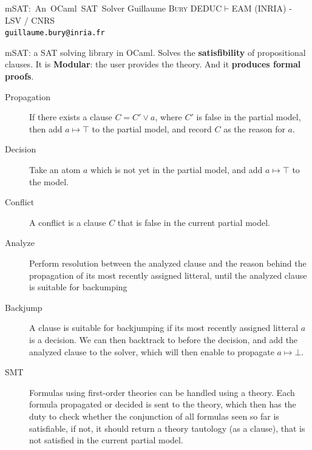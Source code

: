 \documentclass[portrait,a0,final]{a0poster}
\def\msat{\textsf{mSAT}}
\begin{document}
\sffamily %

\postertitle
{\msat{}:~An~OCaml~SAT~Solver}
{Guillaume \textsc{Bury}}
{DEDUC$\vdash$EAM (INRIA) - LSV / CNRS\\
\Large \textcolor{black}{\texttt{guillaume.bury@inria.fr}}}

\begin{center}

\begin{multicols}{2}

{
  \vspace{0.5cm} %

  \msat{}: a SAT solving library in OCaml. Solves the \textbf{satisfibility}
  of propositional clauses. It is \textbf{Modular}: the user provides
  the theory. And it \textbf{produces formal proofs}.
}

{
  \begin{description}
    \item[Propagation] If there exists a clause $C = C' \lor a$, where
      $C'$ is false in the partial model, then add $a \mapsto \top$ to
      the partial model, and record $C$ as the reason for $a$.
    \item[Decision] Take an atom $a$ which is not yet in the partial model,
      and add $a \mapsto \top$ to the model.
    \item[Conflict] A conflict is a clause $C$ that is false in the current partial
      model.
    \item[Analyze] Perform resolution between the analyzed clause and the reason
      behind the propagation of its most recently assigned litteral, until
      the analyzed clause is suitable for backumping
    \item[Backjump] A clause is suitable for backjumping if its most recently
      assigned litteral $a$ is a decision. We can then backtrack to before the
      decision, and add the analyzed clause to the solver, which will then enable
      to propagate $a \mapsto \bot$.
    \item[SMT] Formulas using first-order theories can be handled using a theory.
      Each formula propagated or decided is sent to the theory, which then
      has the duty to check whether the conjunction of all formulas seen so
      far is satisfiable, if not, it should return a theory tautology (as a clause),
      that is not satisfied in the current partial model.
  \end{description}
}


\end{multicols}
\end{center}
\end{document}
